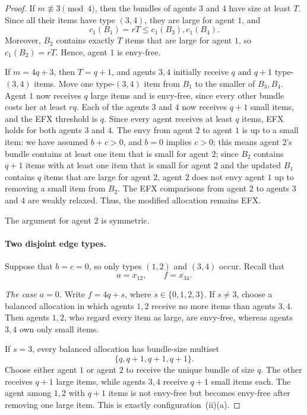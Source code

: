 \documentclass{article}
\theoremstyle{definition}
\begin{document}
\begin{proof}
If $m\not\equiv3\pmod 4$, then the bundles of agents $3$ and $4$ have size
at least $T$.  Since all their items have type $(3,4)$, they are large for
agent $1$, and
\[
 c_1(B_1)=rT\le c_1(B_3),c_1(B_4).
\]
Moreover, $B_2$ contains exactly $T$ items that are large for agent $1$, so
$c_1(B_2)=rT$.  Hence, agent $1$ is envy-free.

If $m=4q+3$, then $T=q+1$, and agents $3,4$ initially receive $q$ and
$q+1$ type-$(3,4)$ items.  Move one type-$(3,4)$ item from $B_1$ to the
smaller of $B_3,B_4$.  Agent $1$ now receives $q$ large items and is
envy-free, since every other bundle costs her at least $rq$.
Each of the agents $3$ and $4$ now receives $q+1$ small items, and the EFX threshold is $q$.
Since every agent receives at least $q$ items, EFX holds for both agents $3$ and $4$.
The envy from agent $2$ to agent $1$ is up to a small item: we have assumed $b+c>0$, and $b=0$ implies $c>0$; this means agent $2$'s bundle contains at least one item that is small for agent $2$; since $B_2$ contains $q+1$ items with at least one item that is small for agent $2$ and the updated $B_1$ contains $q$ items that are large for agent $2$, agent $2$ does not envy agent $1$ up to removing a small item from $B_2$.
The EFX comparisons from agent $2$ to agents $3$ and $4$ are weakly relaxed.  
Thus, the modified allocation remains EFX.  

The argument for agent $2$ is symmetric.

\paragraph{Two disjoint edge types.}
Suppose that $b=c=0$, so only types $(1,2)$ and $(3,4)$ occur.  Recall that
\[
 a=x_{12},\qquad f=x_{34}.
\]

\smallskip
\noindent\emph{The case $a=0$.}
Write $f=4q+s$, where $s\in\{0,1,2,3\}$.  If $s\neq3$, choose a balanced
allocation in which agents $1,2$ receive no more items than agents $3,4$.
Then agents $1,2$, who regard every item as large, are envy-free,
whereas agents $3,4$ own only small items.

If $s=3$, every balanced allocation has bundle-size multiset
\[
 \{q,q+1,q+1,q+1\}.
\]
Choose either agent $1$ or agent $2$ to receive the unique bundle of size
$q$.  The other receives $q+1$ large items, while agents $3,4$ receive
$q+1$ small items each.  The agent among $1,2$ with $q+1$ items is not
envy-free but becomes envy-free after removing one large item.  This
is exactly configuration~(ii)(a).


\end{proof}
\end{document}
